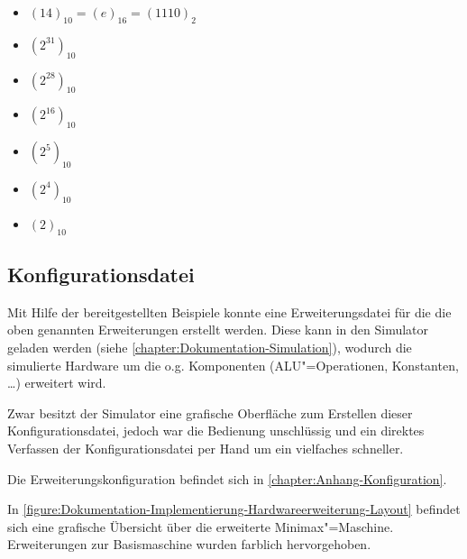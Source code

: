 \begin{itemize}
    \item $(14)_{10} = (e)_{16} = (1110)_2$
    \item $(2^{31})_{10}$
    \item $(2^{28})_{10}$
    \item $(2^{16})_{10}$
    \item $(2^5)_{10}$
    \item $(2^4)_{10}$
    \item $(2)_{10}$
\end{itemize}

\subsection{Konfigurationsdatei}
\label{subsection:Dokumentation-Implementierung-Hardwareerweiterung-Konfigurationsdatei}

Mit Hilfe der bereitgestellten Beispiele konnte eine Erweiterungsdatei für die die oben genannten Erweiterungen erstellt werden. Diese kann in den Simulator geladen werden (siehe \autoref{chapter:Dokumentation-Simulation}), wodurch die simulierte Hardware um die o.g. Komponenten (ALU"=Operationen, Konstanten, \ldots) erweitert wird.

Zwar besitzt der Simulator eine grafische Oberfläche zum Erstellen dieser Kon\-fi\-gu\-ra\-tions\-datei, jedoch war die Bedienung unschlüssig und ein direktes Verfassen der Konfigurationsdatei per Hand um ein vielfaches schneller.

Die Erweiterungskonfiguration befindet sich in \autoref{chapter:Anhang-Konfiguration}.

In \autoref{figure:Dokumentation-Implementierung-Hardwareerweiterung-Layout} befindet sich eine grafische Übersicht über die erweiterte Minimax"=Maschine. Erweiterungen zur Basismaschine wurden farblich hervorgehoben.

